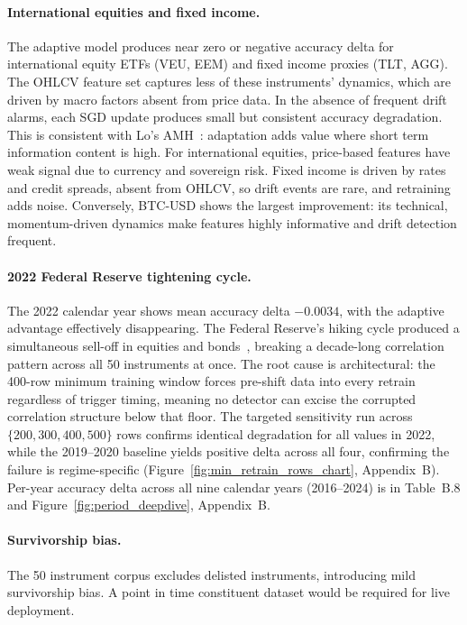 \paragraph{International equities and fixed income.}
The adaptive model produces near zero or negative accuracy delta for international equity ETFs (VEU, EEM) and fixed income proxies (TLT, AGG). The OHLCV feature set captures less of these instruments' dynamics, which are driven by macro factors absent from price data. In the absence of frequent drift alarms, each SGD update produces small but consistent accuracy degradation. This is consistent with Lo's AMH~\cite{lo2004amh}: adaptation adds value where short term information content is high. For international equities, price-based features have weak signal due to currency and sovereign risk. Fixed income is driven by rates and credit spreads, absent from OHLCV, so drift events are rare, and retraining adds noise. Conversely, BTC-USD shows the largest improvement: its technical, momentum-driven dynamics make features highly informative and drift detection frequent.

\paragraph{2022 Federal Reserve tightening cycle.}

The 2022 calendar year shows mean accuracy delta $-0.0034$, with the adaptive advantage effectively disappearing. The Federal Reserve's hiking cycle produced a simultaneous sell-off in equities and bonds~\cite{ang2012regime}, breaking a decade-long correlation pattern across all 50 instruments at once. The root cause is architectural: the 400-row minimum training window forces pre-shift data into every retrain regardless of trigger timing, meaning no detector can excise the corrupted correlation structure below that floor. The targeted sensitivity run across $\{200, 300, 400, 500\}$ rows confirms identical degradation for all values in 2022, while the 2019--2020 baseline yields positive delta across all four, confirming the failure is regime-specific (Figure~\ref{fig:min_retrain_rows_chart}, Appendix~B). Per-year accuracy delta across all nine calendar years (2016--2024) is in Table~B.8 and Figure~\ref{fig:period_deepdive}, Appendix~B.


\paragraph{Survivorship bias.}
The 50 instrument corpus excludes delisted instruments, introducing mild survivorship bias. A point in time constituent dataset would be required for live deployment.

